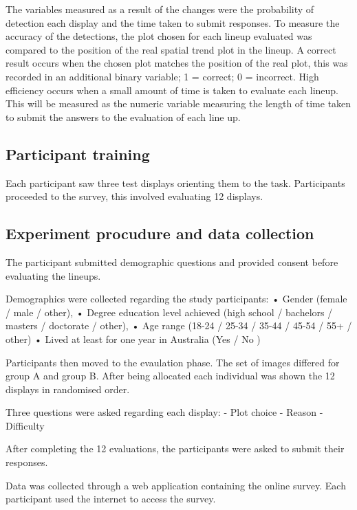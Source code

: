 \documentclass[conference,final,]{IEEEtran}
\begin{document}
The variables measured as a result of the changes were the probability
of detection each display and the time taken to submit responses. To
measure the accuracy of the detections, the plot chosen for each lineup
evaluated was compared to the position of the real spatial trend plot in
the lineup. A correct result occurs when the chosen plot matches the
position of the real plot, this was recorded in an additional binary
variable; 1 = correct; 0 = incorrect. High efficiency occurs when a
small amount of time is taken to evaluate each lineup. This will be
measured as the numeric variable measuring the length of time taken to
submit the answers to the evaluation of each line up.

\hypertarget{participant-training}{%
\subsection{Participant training}\label{participant-training}}

Each participant saw three test displays orienting them to the task.
Participants proceeded to the survey, this involved evaluating 12
displays.

\hypertarget{experiment-procudure-and-data-collection}{%
\subsection{Experiment procudure and data
collection}\label{experiment-procudure-and-data-collection}}

The participant submitted demographic questions and provided consent
before evaluating the lineups.

Demographics were collected regarding the study participants: • Gender
(female / male / other), • Degree education level achieved (high school
/ bachelors / masters / doctorate / other), • Age range (18-24 / 25-34 /
35-44 / 45-54 / 55+ / other) • Lived at least for one year in Australia
(Yes / No )

Participants then moved to the evaulation phase. The set of images
differed for group A and group B. After being allocated each individual
was shown the 12 displays in randomised order.

Three questions were asked regarding each display: - Plot choice -
Reason - Difficulty

After completing the 12 evaluations, the participants were asked to
submit their responses.

Data was collected through a web application containing the online
survey. Each participant used the internet to access the survey.
\end{document}
